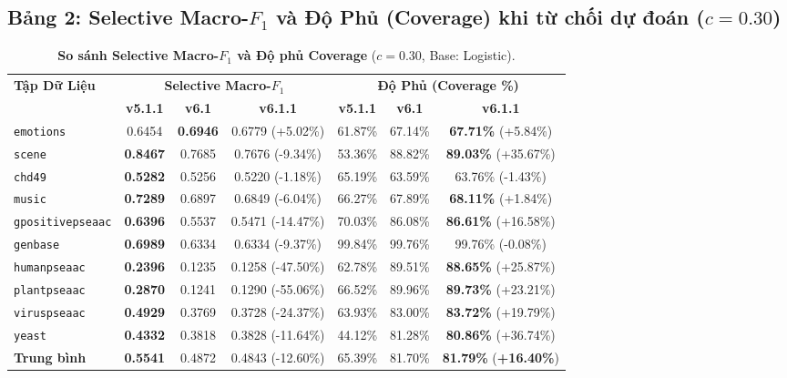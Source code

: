 \documentclass[11pt,a4paper]{article}
\begin{document}
\subsection{Bảng 2: Selective Macro-\texorpdfstring{$F_1$}{F1} và Độ Phủ (Coverage) khi từ chối dự đoán (\texorpdfstring{$c = 0.30$}{c = 0.30})}

\begin{table}[H]
\centering
\small
\caption{\textbf{So sánh Selective Macro-$F_1$ và Độ phủ Coverage} ($c = 0.30$, Base: Logistic).}
\label{tab:selective_coverage_benchmark}
\begin{tabular}{lcccccc}
\toprule
\multirow{2}{*}{\textbf{Tập Dữ Liệu}} & \multicolumn{3}{c}{\textbf{Selective Macro-$F_1$}} & \multicolumn{3}{c}{\textbf{Độ Phủ (Coverage \%)}} \\
\cmidrule(lr){2-4} \cmidrule(lr){5-7}
 & \textbf{v5.1.1} & \textbf{v6.1} & \textbf{v6.1.1} & \textbf{v5.1.1} & \textbf{v6.1} & \textbf{v6.1.1} \\
\midrule
\texttt{emotions} & 0.6454 & \textbf{0.6946} & 0.6779 (+5.02\%) & 61.87\% & 67.14\% & \textbf{67.71\%} (+5.84\%) \\
\texttt{scene} & \textbf{0.8467} & 0.7685 & 0.7676 (-9.34\%) & 53.36\% & 88.82\% & \textbf{89.03\%} (+35.67\%) \\
\texttt{chd49} & \textbf{0.5282} & 0.5256 & 0.5220 (-1.18\%) & 65.19\% & 63.59\% & 63.76\% (-1.43\%) \\
\texttt{music} & \textbf{0.7289} & 0.6897 & 0.6849 (-6.04\%) & 66.27\% & 67.89\% & \textbf{68.11\%} (+1.84\%) \\
\texttt{gpositivepseaac} & \textbf{0.6396} & 0.5537 & 0.5471 (-14.47\%) & 70.03\% & 86.08\% & \textbf{86.61\%} (+16.58\%) \\
\texttt{genbase} & \textbf{0.6989} & 0.6334 & 0.6334 (-9.37\%) & 99.84\% & 99.76\% & 99.76\% (-0.08\%) \\
\texttt{humanpseaac} & \textbf{0.2396} & 0.1235 & 0.1258 (-47.50\%) & 62.78\% & 89.51\% & \textbf{88.65\%} (+25.87\%) \\
\texttt{plantpseaac} & \textbf{0.2870} & 0.1241 & 0.1290 (-55.06\%) & 66.52\% & 89.96\% & \textbf{89.73\%} (+23.21\%) \\
\texttt{viruspseaac} & \textbf{0.4929} & 0.3769 & 0.3728 (-24.37\%) & 63.93\% & 83.00\% & \textbf{83.72\%} (+19.79\%) \\
\texttt{yeast} & \textbf{0.4332} & 0.3818 & 0.3828 (-11.64\%) & 44.12\% & 81.28\% & \textbf{80.86\%} (+36.74\%) \\
\midrule
\textbf{Trung bình} & \textbf{0.5541} & 0.4872 & 0.4843 (-12.60\%) & 65.39\% & 81.70\% & \textbf{81.79\%} (\textbf{+16.40\%}) \\
\bottomrule
\end{tabular}
\end{table}
\end{document}
